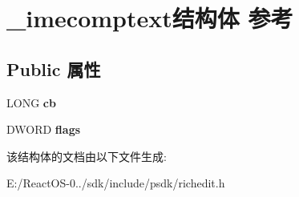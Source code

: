 \hypertarget{struct__imecomptext}{}\section{\+\_\+imecomptext结构体 参考}
\label{struct__imecomptext}
\subsection*{Public 属性}
\begin{DoxyCompactItemize}
\item 
\mbox{\label{struct__imecomptext_a03704f6f34342240ae2ca1f00c9da394}} 
L\+O\+NG {\bfseries cb}
\item 
\mbox{\label{struct__imecomptext_a7b463f6ce7e0718ec6681b01eba86a4f}} 
D\+W\+O\+RD {\bfseries flags}
\end{DoxyCompactItemize}


该结构体的文档由以下文件生成\+:\begin{DoxyCompactItemize}
\item 
E\+:/\+React\+O\+S-\/0../sdk/include/psdk/richedit.\+h\end{DoxyCompactItemize}
